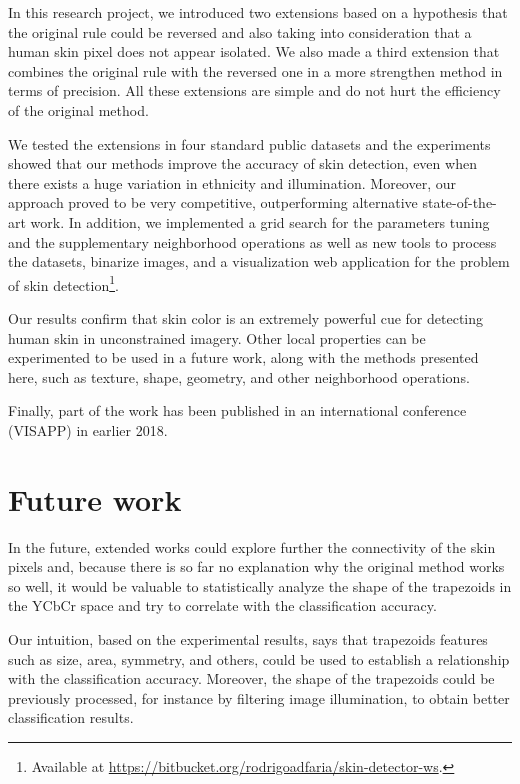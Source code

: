 In this research project, we introduced two extensions based on a hypothesis that the original rule could be reversed and also taking into consideration that a human skin pixel does not appear isolated. We also made a third extension that combines the original rule with the reversed one in a more strengthen method in terms of precision. All these extensions are simple and do not hurt the efficiency of the original method.

We tested the extensions in four standard public datasets and the experiments showed that our methods improve the accuracy of skin detection, even when there exists a huge variation in ethnicity and illumination. Moreover, our approach proved to be very competitive, outperforming alternative state-of-the-art work. In addition, we implemented a grid search for the parameters tuning and the supplementary neighborhood operations as well as new tools to process the datasets, binarize images, and a visualization web application for the problem of skin detection\footnote{Available at \url{https://bitbucket.org/rodrigoadfaria/skin-detector-ws}.}.

Our results confirm that skin color is an extremely powerful cue for detecting human skin in unconstrained imagery. Other local properties can be experimented to be used in a future work, along with the methods presented here, such as texture, shape, geometry, and other neighborhood operations.

Finally, part of the work has been published in an international conference  (VISAPP) in earlier 2018.


\section{Future work}
\label{sec:future_work}

In the future, extended works could explore further the connectivity of the skin pixels and, because there is so far no explanation why the original method works so well, it would be valuable to statistically analyze the shape of the trapezoids in the YCbCr space and try to correlate with the classification accuracy.

Our intuition, based on the experimental results, says that trapezoids features such as size, area, symmetry, and others, could be used to establish a relationship with the classification accuracy. Moreover, the shape of the trapezoids could be previously processed, for instance by filtering image illumination, to obtain better classification results.

